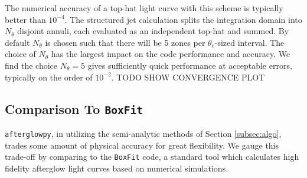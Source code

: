 \documentclass[twocolumn]{aastex62}
\newcommand{\afterglowpy}{{\tt afterglowpy}}
\newcommand{\boxfit}{{\tt BoxFit}}
\newcommand{\thC}{\ensuremath{\theta_{\mathrm{c}}}}
\begin{document}
The numerical accuracy of a top-hat light curve with this scheme is typically better than $10^{-4}$.  The structured jet calculation splits the integration domain into $N_\theta$ disjoint annuli, each evaluated as an independent top-hat and summed.  By default $N_\theta$ is chosen such that there will be 5 zones per $\thC$-sized interval.   The choice of $N_\theta$ has the largest impact on the code performance and accuracy.  We find the choice $N_\theta = 5$ gives sufficiently quick performance at acceptable errors, typically on the order of $10^{-2}$.  TODO SHOW CONVERGENCE PLOT


\subsection{Comparison To \boxfit{}} \label{subsec:boxfitcomp}

\afterglowpy{}, in utilizing the semi-analytic methods of Section \ref{subsec:algo}, trades some amount of physical accuracy for great flexibility.  We gauge this trade-off by comparing to the \boxfit{} code, a standard tool which calculates high fidelity afterglow light curves based on numerical simulations.  
\end{document}
